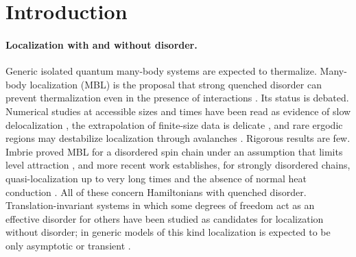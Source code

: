 \section{Introduction}\label{sec:intro}

\paragraph{Localization with and without disorder.}
Generic isolated quantum many-body systems are expected to thermalize.  Many-body localization (MBL) is the
proposal that strong quenched disorder can prevent thermalization even in the presence of interactions
\cite{BAA2006,NandkishoreHuse2015,AbaninRMP2019}.  Its status is debated.  Numerical studies at accessible
sizes and times have been read as evidence of slow delocalization \cite{Suntajs2020,SelsPolkovnikov2021},
the extrapolation of finite-size data is delicate \cite{Abanin2021challenges}, and rare ergodic regions may
destabilize localization through avalanches \cite{DeRoeckHuveneers2017,Morningstar2022}.  Rigorous results
are few.  Imbrie proved MBL for a disordered spin chain under an assumption that limits level attraction
\cite{Imbrie2016}, and more recent work establishes, for strongly disordered chains, quasi-localization up to
very long times \cite{DHMP2023} and the absence of normal heat conduction \cite{DGHP2024}.  All of these
concern Hamiltonians with quenched disorder.  Translation-invariant systems in which some degrees of freedom
act as an effective disorder for others have been studied as candidates for localization without disorder;
in generic models of this kind localization is expected to be only asymptotic or transient
\cite{GroverFisher2014,DeRoeckHuveneers2014,Yao2016}.

